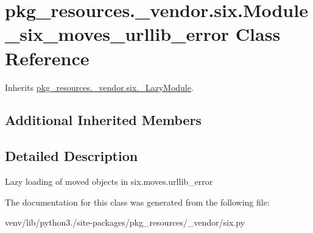\hypertarget{classpkg__resources_1_1__vendor_1_1six_1_1_module__six__moves__urllib__error}{}\section{pkg\+\_\+resources.\+\_\+vendor.\+six.\+Module\+\_\+six\+\_\+moves\+\_\+urllib\+\_\+error Class Reference}
\label{classpkg__resources_1_1__vendor_1_1six_1_1_module__six__moves__urllib__error}


Inherits \hyperlink{classpkg__resources_1_1__vendor_1_1six_1_1___lazy_module}{pkg\+\_\+resources.\+\_\+vendor.\+six.\+\_\+\+Lazy\+Module}.

\subsection*{Additional Inherited Members}


\subsection{Detailed Description}
\begin{DoxyVerb}Lazy loading of moved objects in six.moves.urllib_error\end{DoxyVerb}
 

The documentation for this class was generated from the following file\+:\begin{DoxyCompactItemize}
\item 
venv/lib/python3./site-\/packages/pkg\+\_\+resources/\+\_\+vendor/six.\+py\end{DoxyCompactItemize}
